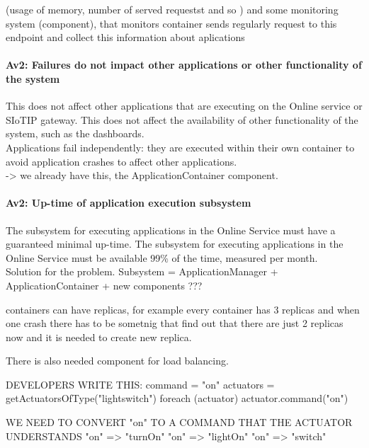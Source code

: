         (usage of memory, number of served requestst and so ) and some monitoring
        system (component), that monitors container sends regularly request to this endpoint
        and  collect this information about aplications

    \paragraph{Av2: Failures do not impact other applications or other functionality of the system}
        This does not affect other applications that are executing on the Online
        service or SIoTIP gateway. This does not affect the availability of
        other functionality of the system, such as the dashboards. \\
        Applications fail independently: they are executed within their own
        container to avoid application crashes to affect other applications.\\
       -> we already have this, the ApplicationContainer component.

    \paragraph{Av2: Up-time of application execution subsystem}
        The subsystem for executing applications in the Online Service must
        have a guaranteed minimal up-time. The subsystem for executing
        applications in the Online Service must be available
        99\% of the time, measured per month. \\
        Solution for the problem.
        Subsystem = ApplicationManager + ApplicationContainer + new components ???

        containers can have replicas, for example every container has 3 replicas and
        when one crash  there has to be sometnig that find out that there are
        just 2 replicas now and it is needed to create new replica.

        There is also needed component for load balancing.


        DEVELOPERS WRITE THIS: command = "on"
        actuators = getActuatorsOfType("lightswitch")
        foreach (actuator) {
            actuator.command("on")
        }

        WE NEED TO CONVERT "on" TO A COMMAND THAT THE ACTUATOR UNDERSTANDS
        "on" => "turnOn"
        "on" => "lightOn"
        "on" => "switch"

